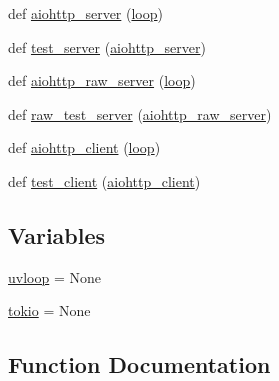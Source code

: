 \begin{DoxyCompactItemize}
def \hyperlink{namespaceaiohttp_1_1pytest__plugin_a2b336ccaec737fd03defdd7b85534093}{aiohttp\+\_\+server} (\hyperlink{namespaceaiohttp_1_1pytest__plugin_a3666e22bceb1b3c3e28c97b5346cb61e}{loop})
\item 
def \hyperlink{namespaceaiohttp_1_1pytest__plugin_a255e4480fd1be15147521161583f9472}{test\+\_\+server} (\hyperlink{namespaceaiohttp_1_1pytest__plugin_a2b336ccaec737fd03defdd7b85534093}{aiohttp\+\_\+server})
\item 
def \hyperlink{namespaceaiohttp_1_1pytest__plugin_a53921f00d47161b403b2fb3632805edf}{aiohttp\+\_\+raw\+\_\+server} (\hyperlink{namespaceaiohttp_1_1pytest__plugin_a3666e22bceb1b3c3e28c97b5346cb61e}{loop})
\item 
def \hyperlink{namespaceaiohttp_1_1pytest__plugin_a58cb78466b179efba0f8422657e5388b}{raw\+\_\+test\+\_\+server} (\hyperlink{namespaceaiohttp_1_1pytest__plugin_a53921f00d47161b403b2fb3632805edf}{aiohttp\+\_\+raw\+\_\+server})
\item 
def \hyperlink{namespaceaiohttp_1_1pytest__plugin_a10d28bc47d04d5015fa1c9ebbe243af0}{aiohttp\+\_\+client} (\hyperlink{namespaceaiohttp_1_1pytest__plugin_a3666e22bceb1b3c3e28c97b5346cb61e}{loop})
\item 
def \hyperlink{namespaceaiohttp_1_1pytest__plugin_ad781032bed1cac6b539a8fbca15260b6}{test\+\_\+client} (\hyperlink{namespaceaiohttp_1_1pytest__plugin_a10d28bc47d04d5015fa1c9ebbe243af0}{aiohttp\+\_\+client})
\end{DoxyCompactItemize}
\subsection*{Variables}
\begin{DoxyCompactItemize}
\item 
\hyperlink{namespaceaiohttp_1_1pytest__plugin_a527f0c17cb15d76b7aa1b91613aaa5a8}{uvloop} = None
\item 
\hyperlink{namespaceaiohttp_1_1pytest__plugin_ab171d4134bf53d5c094c3169fa2ebbbf}{tokio} = None
\end{DoxyCompactItemize}


\subsection{Function Documentation}
\mbox{\label{namespaceaiohttp_1_1pytest__plugin_a10d28bc47d04d5015fa1c9ebbe243af0}} 
